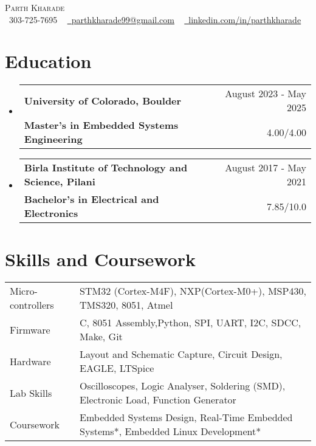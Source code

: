 \documentclass[a4,11pt]{article}
\makeatletter
\newcommand{\resumeSubheading}[4]{
  \vspace{-2pt}\item
    \begin{tabular*}{1.0\textwidth}[t]{l@{\extracolsep{\fill}}r}
       {\large \textbf{#1}} &  {\large #2} \\
      \textbf{#3} & { #4} \\
    \end{tabular*}\vspace{-1pt}
}
\newcommand{\resumeSubHeadingListStart}{\begin{itemize}[leftmargin=0.0in, label={}]}
\newcommand{\resumeSubHeadingListEnd}{\end{itemize}}
\makeatother
\begin{document}
\begin{center}
    {\Huge \scshape Parth Kharade} \\ \vspace{1pt}
    \small \raisebox{-0.1\height}\faPhone\ 303-725-7695 ~ \href{mailto:parthkharade99@gmail.com}{\raisebox{-0.2\height}\faEnvelope\  \underline{parthkharade99@gmail.com}} ~ 
    \href{https://www.linkedin.com/in/parth-k-081287184/}{\raisebox{-0.2\height}\faLinkedin\ \underline{linkedin.com/in/parthkharade}}  ~
    \vspace{-16pt}
\end{center}


\section{Education}
  \resumeSubHeadingListStart
    \resumeSubheading
      {University of Colorado, Boulder}{August 2023 - May 2025}
      {Master's in Embedded Systems Engineering}{4.00/4.00}
      \vspace{-0.1in}
    \resumeSubheading
      {Birla Institute of Technology and Science, Pilani}{August 2017 - May 2021}
      {Bachelor's in Electrical and Electronics}{7.85/10.0}
  \resumeSubHeadingListEnd
 \vspace{-16pt}
 \section{Skills and Coursework}
 \vspace{-4mm}
\begin{table}[!htb]
    \begin{tabular}{ m{3.1cm} | m{16cm} } 
      {Micro-controllers}&{\: STM32 (Cortex-M4F), NXP(Cortex-M0+), MSP430, TMS320, 8051, Atmel} \\
      {Firmware}&{\: C, 8051 Assembly,Python, SPI, UART, I2C, SDCC, Make, Git} \\
      {Hardware}&{\: Layout and Schematic Capture, Circuit Design, EAGLE, LTSpice} \\
      {Lab Skills}&{\: Oscilloscopes, Logic Analyser, Soldering (SMD), Electronic Load, Function Generator} \\
      {Coursework}&{\: Embedded Systems Design, Real-Time Embedded Systems*, Embedded Linux Development*} \\
    \end{tabular}
\end{table}
 \vspace{-16pt}
\end{document}
